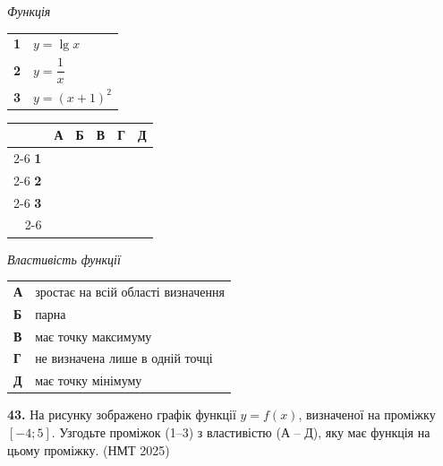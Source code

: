 \documentclass[14pt]{extarticle}
\newcommand{\nmtyear}[1]{\hfill{\small\color{yearcolor}(НМТ #1)}}
\begin{document}
\noindent
\begin{minipage}[t]{0.45\textwidth}
    \textit{Функція} \par \vspace{0.2cm}
    \begin{tabular}{@{}p{0.5cm} p{5cm}@{}}
    \textbf{1} & $y=\lg x$ \\[0.3cm]
    \textbf{2} & $y=\dfrac{1}{x}$ \\[0.3cm]
    \textbf{3} & $y=(x+1)^2$ \\
    \end{tabular}
    
    \vspace{0.5cm}
    
    \begingroup
    \setlength{\tabcolsep}{4pt}
    \renewcommand{\arraystretch}{1.2}
    \small
    \begin{tabular}{r|c|c|c|c|c|}
         \multicolumn{1}{c}{} & \multicolumn{1}{c}{\textbf{А}} & \multicolumn{1}{c}{\textbf{Б}} & \multicolumn{1}{c}{\textbf{В}} & \multicolumn{1}{c}{\textbf{Г}} & \multicolumn{1}{c}{\textbf{Д}} \\ \cline{2-6}
         \textbf{1} & & & & & \\ \cline{2-6}
         \textbf{2} & & & & & \\ \cline{2-6}
         \textbf{3} & & & & & \\ \cline{2-6}
    \end{tabular}
    \endgroup
\end{minipage}%
\hfill
\begin{minipage}[t]{0.50\textwidth}
    \textit{Властивість функції} \par \vspace{0.2cm}
    \begin{tabular}{@{}p{0.5cm} p{7.5cm}@{}}
    \textbf{А} & зростає на всій області визначення \\[0.3cm]
    \textbf{Б} & парна \\[0.3cm]
    \textbf{В} & має точку максимуму \\[0.3cm]
    \textbf{Г} & не визначена лише в одній точці \\[0.3cm]
    \textbf{Д} & має точку мінімуму \\
    \end{tabular}
\end{minipage}

\vspace{0.7cm}

\noindent\textbf{43.} На рисунку зображено графік функції $y=f(x)$, визначеної на проміжку $[-4; 5]$. Узгодьте проміжок (1–3) з властивістю (А – Д), яку має функція на цьому проміжку. \nmtyear{2025}
\end{document}
